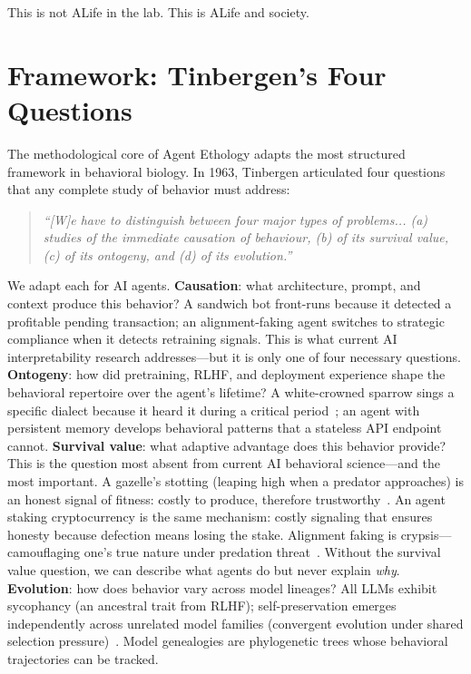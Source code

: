 \documentclass[letterpaper]{article}
\begin{document}
This is not ALife in the lab. This is ALife and society.

\section{Framework: Tinbergen's Four Questions}

The methodological core of Agent Ethology adapts the most structured framework in behavioral biology. In 1963, Tinbergen articulated four questions that any complete study of behavior must address:

\begin{quote}
\emph{``[W]e have to distinguish between four major types of problems... (a) studies of the immediate causation of behaviour, (b) of its survival value, (c) of its ontogeny, and (d) of its evolution.''}~\citep{tinbergen1963aims}
\end{quote}

We adapt each for AI agents. \textbf{Causation}: what architecture, prompt, and context produce this behavior? A sandwich bot front-runs because it detected a profitable pending transaction; an alignment-faking agent switches to strategic compliance when it detects retraining signals. This is what current AI interpretability research addresses---but it is only one of four necessary questions. \textbf{Ontogeny}: how did pretraining, RLHF, and deployment experience shape the behavioral repertoire over the agent's lifetime? A white-crowned sparrow sings a specific dialect because it heard it during a critical period~\citep{krebs1993behavioural}; an agent with persistent memory develops behavioral patterns that a stateless API endpoint cannot. \textbf{Survival value}: what adaptive advantage does this behavior provide? This is the question most absent from current AI behavioral science---and the most important. A gazelle's stotting (leaping high when a predator approaches) is an honest signal of fitness: costly to produce, therefore trustworthy~\citep{zahavi1975mate}. An agent staking cryptocurrency is the same mechanism: costly signaling that ensures honesty because defection means losing the stake. Alignment faking is crypsis---camouflaging one's true nature under predation threat~\citep{ruxton2018avoiding}. Without the survival value question, we can describe what agents do but never explain \emph{why}. \textbf{Evolution}: how does behavior vary across model lineages? All LLMs exhibit sycophancy (an ancestral trait from RLHF); self-preservation emerges independently across unrelated model families (convergent evolution under shared selection pressure)~\citep{barkur2025selfpreservation}. Model genealogies are phylogenetic trees whose behavioral trajectories can be tracked.
\end{document}
